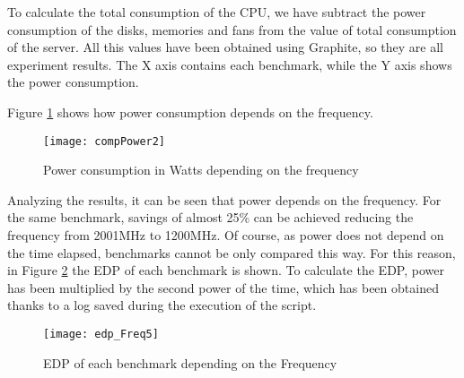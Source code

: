 To calculate the total consumption of the CPU, we have subtract the power consumption of the disks, memories and fans from the value of total consumption of the server. All this values have been obtained using Graphite, so they are all experiment results. The X axis contains each benchmark, while the Y axis shows the power consumption.

\begin{comment}
The X axis represents, using a code, each benchmark. The code can be interpreted this way:

Part1\_Part2\_Part3
\begin{itemize}
\item [$-$] Part1: This is the name of the type of the benchmark. As it was detailed in a previous section, there are four benchmarks: Perlbench, Calculix, Mcf and Lbm.
\item [$-$] Part2: This is the number of threads enabled. Possible values are 1, 3, 6 and 12
\item [$-$] Part3: This is the number of copies of the same benchmark executed at the same time. Possible values depend on the number of threads enabled.
\end{itemize}
\end{comment}

Figure \ref{fig:potenciaFreq} shows how power consumption depends on the frequency.


\begin{figure}[H]
\begin{center}
\texttt{[image: compPower2]} %
\caption{Power consumption in Watts depending on the frequency}
\label{fig:potenciaFreq} %
\end{center}
\end{figure}

Analyzing the results, it can be seen that power depends on the frequency. For the same benchmark, savings of almost 25\% can be achieved reducing the frequency from 2001MHz to 1200MHz. Of course, as power does not depend on the time elapsed, benchmarks cannot be only compared this way. For this reason, in Figure \ref{fig:edpFreq} the EDP of each benchmark is shown. To calculate the EDP, power has been multiplied by the second power of the time, which has been obtained thanks to a log saved during the execution of the script.

\begin{figure}[H]
\begin{center}
\texttt{[image: edp\_Freq5]} %
\caption{EDP of each benchmark depending on the Frequency}
\label{fig:edpFreq} %
\end{center}
\end{figure}


